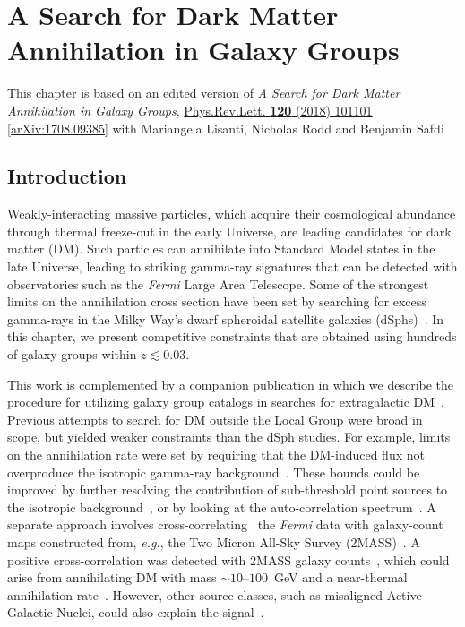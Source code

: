 \chapter{A Search for Dark Matter Annihilation in Galaxy Groups}
\label{ch:groups_data}

This chapter is based on an edited version of \emph{A Search for Dark Matter Annihilation in Galaxy Groups},  \href{https://journals.aps.org/prl/abstract/10.1103/PhysRevLett.120.101101}{Phys.Rev.Lett. \textbf{120} (2018) 101101} \href{https://arxiv.org/abs/1708.09385}{[arXiv:1708.09385]} with Mariangela Lisanti, Nicholas Rodd and Benjamin Safdi~\cite{Lisanti:2017qlb}.

\section{Introduction}

Weakly-interacting massive particles, which acquire their cosmological abundance through thermal freeze-out in the early Universe, are leading candidates for dark matter (DM).  Such particles can annihilate into Standard Model states in the late Universe, leading to striking gamma-ray signatures that can be detected with observatories such as the {\it Fermi} Large Area Telescope.  
Some of the strongest limits on the annihilation cross section have been set by searching for excess gamma-rays in the Milky Way's dwarf spheroidal satellite galaxies (dSphs)~\cite{Ackermann:2015zua,Fermi-LAT:2016uux}.  In this chapter, we present competitive constraints that are obtained using hundreds of galaxy groups within $z\lesssim0.03$. 

This work is complemented by a companion publication in which we describe the procedure for utilizing  galaxy group catalogs in searches for extragalactic DM~\cite{companion}.  Previous attempts to search for DM outside the Local Group were broad in scope, but yielded weaker constraints than the dSph studies.  For example, limits on the annihilation rate were set by requiring that the DM-induced flux not overproduce the isotropic gamma-ray background~\cite{Ackermann:2015tah}.  These bounds could be improved by further resolving the contribution of sub-threshold point sources to the isotropic background~\cite{Zechlin:2016pme,Lisanti:2016jub}, or by  
looking at the auto-correlation spectrum~\cite{Ackermann:2012uf, Ackermann:2012uf,Ando:2006cr,Ando:2013ff}.  A separate approach involves cross-correlating~\cite{Xia:2011ax,Ando:2014aoa,Ando:2013xwa,Xia:2015wka,Regis:2015zka,Cuoco:2015rfa,Ando:2016ang} the {\it Fermi} data with galaxy-count maps constructed from, \emph{e.g.}, the Two Micron All-Sky Survey (2MASS)~\cite{Jarrett:2000me,Bilicki:2013sza}.  A positive cross-correlation was detected with 2MASS galaxy counts~\cite{Xia:2015wka}, which could arise from annihilating DM with mass $\sim$$10$--$100$~GeV and a near-thermal annihilation rate~\cite{Regis:2015zka}.  However, other source classes, such as misaligned Active Galactic Nuclei, could also explain the signal~\cite{Cuoco:2015rfa}.
  
